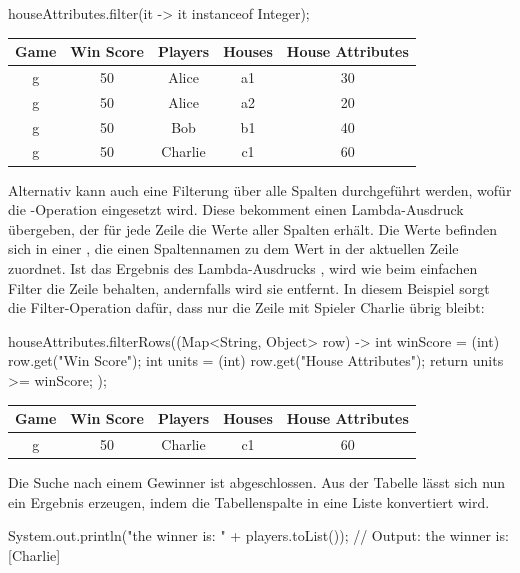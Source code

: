 \begin{jcodeblock}
    houseAttributes.filter(it -> it instanceof Integer);
\end{jcodeblock}

\begin{tabular}{|c|c|c|c|c|}
    \hline
    \textbf{Game} & \textbf{Win Score} & \textbf{Players} & \textbf{Houses} & \textbf{House Attributes} \\
    \hline
    g & 50 & Alice   & a1 & 30      \\
    g & 50 & Alice   & a2 & 20      \\
    g & 50 & Bob     & b1 & 40      \\
    g & 50 & Charlie & c1 & 60      \\
    \hline
\end{tabular}

Alternativ kann auch eine Filterung über alle Spalten durchgeführt werden, wofür die -Operation eingesetzt wird.
Diese bekomment einen Lambda-Ausdruck übergeben, der für jede Zeile die Werte aller Spalten erhält.
Die Werte befinden sich in einer , die einen Spaltennamen zu dem Wert in der aktuellen Zeile zuordnet.
Ist das Ergebnis des Lambda-Ausdrucks , wird wie beim einfachen Filter die Zeile behalten, andernfalls wird sie entfernt.
In diesem Beispiel sorgt die Filter-Operation dafür, dass nur die Zeile mit Spieler Charlie übrig bleibt:

\begin{jcodeblock}
    houseAttributes.filterRows((Map<String, Object> row) -> {
        int winScore = (int) row.get("Win Score");
        int units = (int) row.get("House Attributes");
        return units >= winScore;
    });
\end{jcodeblock}

\begin{tabular}{|c|c|c|c|c|}
    \hline
    \textbf{Game} & \textbf{Win Score} & \textbf{Players} & \textbf{Houses} & \textbf{House Attributes} \\
    \hline
    g & 50 & Charlie & c1 & 60 \\
    \hline
\end{tabular}

Die Suche nach einem Gewinner ist abgeschlossen.
Aus der Tabelle lässt sich nun ein Ergebnis erzeugen, indem die Tabellenspalte  in eine Liste konvertiert wird.

\begin{jcodeblock}
    System.out.println("the winner is: " + players.toList());
    // Output: the winner is: [Charlie]
\end{jcodeblock}

